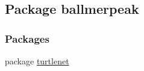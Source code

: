 \hypertarget{namespaceballmerpeak}{\subsection{Package ballmerpeak}
\label{namespaceballmerpeak}
}
\subsubsection*{Packages}
\begin{DoxyCompactItemize}
\item 
package \hyperlink{namespaceballmerpeak_1_1turtlenet}{turtlenet}
\end{DoxyCompactItemize}
